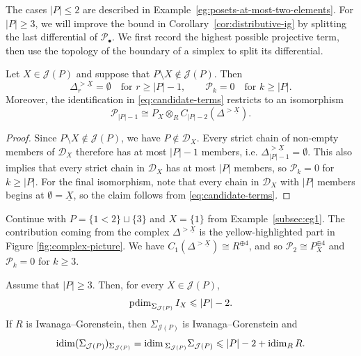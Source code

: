 \documentclass[a4paper,leqno]{amsart}
\begin{document}
The cases $|P|\leq2$ are described in Example~\ref{eg:posets-at-most-two-elements}. For $|P|\geq3$, we will improve the bound in Corollary~\ref{cor:distributive-ig} by splitting the last differential of $\mathcal P_\bullet$. We first record the highest possible projective term, then use the topology of the boundary of a simplex to split its differential.

\begin{lem}\label{lem:chain-degree-bound}
Let $X\in\mathcal J(P)$ and suppose that $P\setminus X\notin\mathcal J(P)$. Then
\[
\Delta^{>\underline X}_r=\emptyset
\quad\text{for }r\geq|P|-1,
\qquad
\mathcal P_k=0
\quad\text{for }k\geq|P|.
\]
Moreover, the identification in \eqref{eq:candidate-terms} restricts to an isomorphism
\[
\mathcal P_{|P|-1}
\cong P_X\otimes_R C_{|P|-2}(\Delta^{>\underline X}).
\]
\end{lem}

\begin{proof}
Since $P\setminus X\notin\mathcal J(P)$, we have $P\notin\mathcal D_X$. Every strict chain of non-empty members of $\mathcal D_X$ therefore has at most $|P|-1$ members, i.e. $\Delta^{>\underline X}_{|P|-1}=\emptyset$.   This also implies that every strict chain in $\mathcal D_X$ has at most $|P|$ members, so $\mathcal P_k=0$ for $k\geq|P|$. For the final isomorphism, note that every chain in $\mathcal D_X$ with $|P|$ members begins at $\emptyset=\underline X$, so the claim follows from \eqref{eq:candidate-terms}.
\end{proof}

\begin{eg}\label{eg:chain-degree-bound}
Continue with $P=\{1<2\}\sqcup\{3\}$ and $X=\{1\}$ from Example~\ref{subsec:eg1}. The contribution coming from the complex $\Delta^{>\underline X}$ is the yellow-highlighted part in Figure \ref{fig:complex-picture}.  We have $C_1(\Delta^{>\underline X})\cong R^{\oplus 4}$, and so $\mathcal{P}_2\cong P_X^{\oplus 4}$ and $\mathcal{P}_k=0$ for $k\ge 3$.
\end{eg}


\begin{prop}\label{prop:n-2-inequalities}
Assume that $|P|\geq3$. Then, for every $X\in\mathcal J(P)$,
\[
\operatorname{pdim}_{\Sigma_{\mathcal J(P)}}I_X\leqslant |P|-2.
\]
If $R$ is Iwanaga--Gorenstein, then $\Sigma_{\mathcal J(P)}$ is Iwanaga--Gorenstein and
\[
\operatorname{idim}(\Sigma_{\mathcal J(P)})_{\Sigma_{\mathcal J(P)}}
=\operatorname{idim}{}_{\Sigma_{\mathcal J(P)}}\Sigma_{\mathcal J(P)}
\leqslant |P|-2+\operatorname{idim}_R R.
\]
\end{prop}
\end{document}
